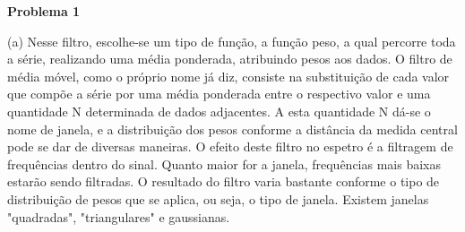 \documentclass[12pt,portuguese,a4paper,pdftex]{article}
\begin{document}
% 

{\bf Problema 1}

(a) Nesse filtro, escolhe-se um tipo de função, a função peso, a qual percorre toda a série, realizando uma média ponderada, atribuindo pesos aos dados. O filtro de média móvel, como o próprio nome já diz, consiste na substituição de cada valor que compõe a série por uma média ponderada entre o respectivo valor e uma quantidade N determinada de dados adjacentes. A esta quantidade N dá-se o nome de janela, e a distribuição dos pesos conforme a distância da medida central pode se dar de diversas maneiras. O efeito deste filtro no espetro é a filtragem de frequências dentro do sinal. Quanto maior for a janela, frequências mais baixas estarão sendo filtradas. O resultado do filtro varia bastante conforme o tipo de distribuição de pesos que se aplica, ou seja, o tipo de janela. Existem janelas "quadradas", "triangulares" e gaussianas.
\end{document}

